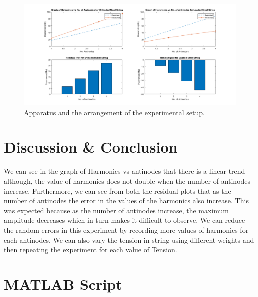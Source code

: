 \newpage
\begin{figure}[h!]
   \centering
    \includegraphics[width=\textwidth]{figures/SubplotsExp12.png}
    \caption{Apparatus and the arrangement of the experimental setup.}
    \label{fig:yx}
\end{figure}



\section{Discussion \& Conclusion}

We can see in the graph of Harmonics vs antinodes that there is a linear trend although, the value of harmonics does not double when the number of antinodes increase. Furthermore, we can see from both the residual plots that as the number of antinodes the error in the values of the harmonics also increase. This was expected because as the number of antinodes increase, the maximum amplitude decreases which in turn makes it difficult to observe.  We can reduce the random errors in this experiment by recording more values of harmonics for each antinodes. We can also vary the tension in string using different weights and then repeating the experiment for each value of Tension.

\section{MATLAB Script}




